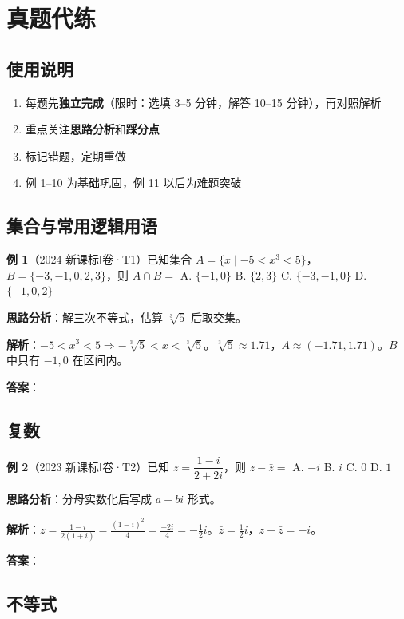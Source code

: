 \section{真题代练}

\subsection{使用说明}

\begin{enumerate}
  \item 每题先\textbf{独立完成}（限时：选填 3--5 分钟，解答 10--15 分钟），再对照解析
  \item 重点关注\textbf{思路分析}和\textbf{踩分点}
  \item 标记错题，定期重做
  \item 例 1--10 为基础巩固，例 11 以后为难题突破
\end{enumerate}

\subsection{集合与常用逻辑用语}

\textbf{例 1}（2024 新课标Ⅰ卷·T1）已知集合 $A = \{x \mid -5 < x^3 < 5\}$，$B = \{-3,-1,0,2,3\}$，则 $A \cap B =$
A. $\{-1,0\}$ \quad B. $\{2,3\}$ \quad C. $\{-3,-1,0\}$ \quad D. $\{-1,0,2\}$

\textbf{思路分析}：解三次不等式，估算 $\sqrt[3]{5}$ 后取交集。

\textbf{解析}：$-5 < x^3 < 5 \Rightarrow -\sqrt[3]{5} < x < \sqrt[3]{5}$。$\sqrt[3]{5} \approx 1.71$，$A \approx (-1.71,1.71)$。$B$ 中只有 $-1,0$ 在区间内。

\textbf{答案}：

\subsection{复数}

\textbf{例 2}（2023 新课标Ⅰ卷·T2）已知 $z = \dfrac{1-i}{2+2i}$，则 $z - \bar{z} =$
A. $-i$ \quad B. $i$ \quad C. $0$ \quad D. $1$

\textbf{思路分析}：分母实数化后写成 $a+bi$ 形式。

\textbf{解析}：$z = \frac{1-i}{2(1+i)} = \frac{(1-i)^2}{4} = \frac{-2i}{4} = -\frac12 i$。$\bar{z}=\frac12 i$，$z-\bar{z}=-i$。

\textbf{答案}：

\subsection{不等式}

